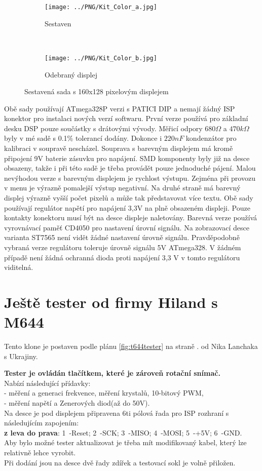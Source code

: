\begin{figure}[H]
  \begin{subfigure}[b]{9cm}
    \centering
    \texttt{[image: ../PNG/Kit\_Color\_a.jpg]}
    \caption{Sestaven}
  \end{subfigure}
  ~
  \begin{subfigure}[b]{9cm}
    \centering
    \texttt{[image: ../PNG/Kit\_Color\_b.jpg]}
    \caption{Odebraný displej}
  \end{subfigure}
  \caption{Sestavená sada s 160x128 pixelovým displejem}
  \label{fig:Kit_color}
\end{figure}

Obě sady používají ATmega328P verzi s PATICI DIP a nemají žádný ISP konektor pro instalaci nových
verzí softwaru. První verze používá pro základní desku DSP pouze součástky s drátovými vývody. Měřicí odpory \(680\Omega\) a \(470k\Omega\) byly v mé sadě s 0.1\% tolerancí dodány.
Dokonce i \(220 nF\) kondenzátor pro kalibraci v soupravě nescházel.
Souprava s barevným displejem má kromě připojení 9V baterie zásuvku pro napájení.
SMD komponenty byly již na desce obsazeny, takže i při této sadě je třeba provádět pouze jednoduché pájení.
Malou nevýhodou verze s barevným displejem je rychlost výstupu.
Zejména při provozu v menu je výrazně pomalejší výstup negativní.
Na druhé straně má barevný displej výrazně vyšší počet pixelů a může tak představovat více textu.
Obě sady používají regulátor napětí pro napájení 3,3V na plně obsazeném displeji.
Pouze kontakty konektoru musí být na desce displeje naletovány.
Barevná verze používá vyrovnávací paměť CD4050 pro nastavení úrovní signálu.
Na zobrazovací desce varianta ST7565 není vidět žádné nastavení úrovně signálu.
Pravděpodobně vybraná verze regulátoru toleruje úrovně signálu 5V ATmega328.
V žádném případě není žádná ochranná dioda proti napájení 3,3 V v tomto regulátoru viditelná.

\section{Ještě tester od firmy Hiland s M644}
Tento  klone je postaven podle plánu \ref{fig:t644tester} na straně \pageref{T644}. od Nika Lanchaka s Ukrajiny.

\vspace{0,3cm}
{\bf Tester je ovládán tlačítkem, které je zároveň rotační snímač.}
\\Nabízí následující přídavky:
\vspace{0,2cm}
\\- měření a generaci frekvence, měření krystalů,  10-bitový PWM,
\\- měření napětí a Zenerových diod(až do 50V).
\\Na desce je pod displejem připravena 6ti pólová řada pro ISP rozhraní s následujícím zapojením:
\\{\bf z leva do prava}: 1~-Reset; 2~-SCK; 3~-MISO; 4~-MOSI; 5~-+5V; 6~-GND.
\\Aby bylo možné tester aktualizovat je třeba mít modifikovaný kabel, který lze relativně lehce vyrobit.
\\Při dodání jsou na desce dvě řady zdířek a testovací sokl je volně přiložen.


